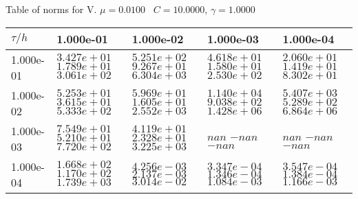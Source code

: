 \begin{center}
Table of norms for V. $\mu = 0.0100$ \, $C = 10.0000$, $\gamma = 1.0000$
  
\begin{tabular}{|p{1in}|p{1in}|p{1in}|p{1in}|p{1in}|} \hline
$\tau / h$ &1.000e-01 &1.000e-02 &1.000e-03 &1.000e-04 \\ \hline 
1.000e-01 & $3.427e+01$  $1.789e+01$  $3.061e+02$  & $5.251e+02$  $9.267e+01$  $6.304e+03$  & $4.618e+01$  $1.580e+01$  $2.530e+02$  & $2.060e+01$  $1.419e+01$  $8.302e+01$  \\ \hline 
1.000e-02 & $5.253e+01$  $3.615e+01$  $5.333e+02$  & $5.969e+01$  $1.605e+01$  $2.552e+03$  & $1.140e+04$  $9.038e+02$  $1.428e+06$  & $5.407e+03$  $5.289e+02$  $6.864e+06$  \\ \hline 
1.000e-03 & $7.549e+01$  $5.210e+01$  $7.720e+02$  & $4.119e+01$  $2.328e+01$  $3.225e+03$  & $nan$  $-nan$  $-nan$  & $nan$  $-nan$  $-nan$  \\ \hline 
1.000e-04 & $1.668e+02$  $1.170e+02$  $1.739e+03$  & $4.256e-03$  $2.137e-03$  $3.014e-02$  & $3.347e-04$  $1.346e-04$  $1.084e-03$  & $3.547e-04$  $1.384e-04$  $1.166e-03$  \\ \hline 

\end{tabular}\\[20pt]
\end{center}
